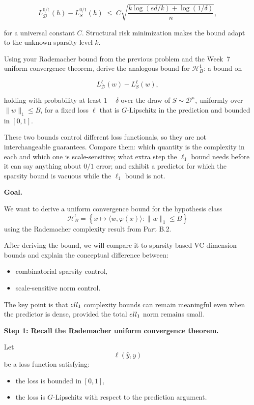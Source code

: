 \documentclass[11pt]{article}
\begin{document}
\begin{enumerate}
\[
L^{0/1}_{\mathcal{D}}(h) - L^{0/1}_{S}(h)
\;\le\;
C \sqrt{\frac{k \log(e d / k) + \log(1/\delta)}{n}},
\]


for a universal constant $C$.  
Structural risk minimization makes the bound adapt to the unknown sparsity level $k$.

Using your Rademacher bound from the previous problem and the Week~7 uniform 
convergence theorem, derive the analogous bound for $\mathcal{H}^{1}_{B}$: a bound on


\[
L^{\ell}_{\mathcal{D}}(w) - L^{\ell}_{S}(w),
\]


holding with probability at least $1 - \delta$ over the draw of $S \sim \mathcal{D}^n$, 
uniformly over $\|w\|_{1} \le B$, for a fixed loss $\ell$ that is $G$-Lipschitz in the 
prediction and bounded in $[0,1]$.

These two bounds control different loss functionals, so they are not interchangeable 
guarantees. Compare them: which quantity is the complexity in each and which one is 
scale-sensitive; what extra step the $\ell_1$ bound needs before it can say anything 
about $0/1$ error; and exhibit a predictor for which the sparsity bound is vacuous 
while the $\ell_1$ bound is not.

\begin{solutionbox}

\textbf{Goal.}

We want to derive a uniform convergence bound for the hypothesis class
\[
\mathcal H_B^1
=
\left\{
x\mapsto\langle w,\varphi(x)\rangle :
\|w\|_1\le B
\right\}
\]
using the Rademacher complexity result from Part B.2.

After deriving the bound, we will compare it to sparsity-based VC dimension bounds and explain the conceptual difference between:
\begin{itemize}
    \item combinatorial sparsity control,
    \item scale-sensitive norm control.
\end{itemize}

The key point is that $\\ell_1$ complexity bounds can remain meaningful even when the predictor is dense, provided the total $\\ell_1$ norm remains small.

\medskip

\textbf{Step 1: Recall the Rademacher uniform convergence theorem.}

Let
\[
\ell(\hat y,y)
\]
be a loss function satisfying:
\begin{itemize}
    \item the loss is bounded in $[0,1]$,
    \item the loss is $G$-Lipschitz with respect to the prediction argument.
\end{itemize}


\end{solutionbox}
\end{enumerate}
\end{document}

